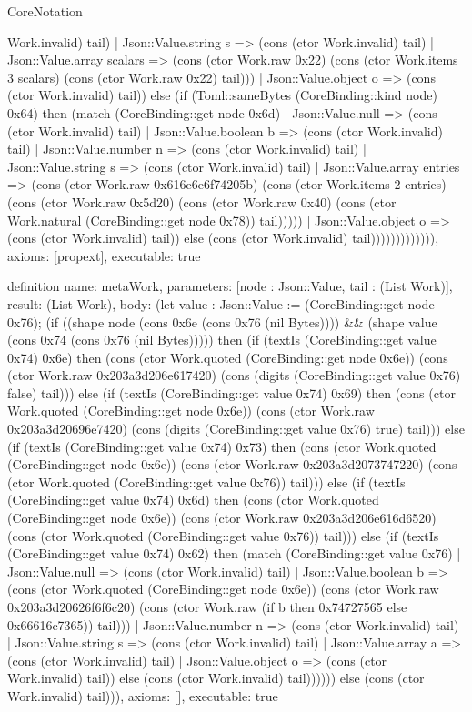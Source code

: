 \begin{lexlean}{CoreNotation}
\begin{semanticmodule}
{Work.invalid) tail) | Json::Value.string s => (cons (ctor Work.invalid) tail) | Json::Value.array scalars => (cons (ctor Work.raw 0x22) (cons (ctor Work.items 3 scalars) (cons (ctor Work.raw 0x22) tail))) | Json::Value.object o => (cons (ctor Work.invalid) tail)) else (if (Toml::sameBytes (CoreBinding::kind node) 0x64) then (match (CoreBinding::get node 0x6d) | Json::Value.null => (cons (ctor Work.invalid) tail) | Json::Value.boolean b => (cons (ctor Work.invalid) tail) | Json::Value.number n => (cons (ctor Work.invalid) tail) | Json::Value.string s => (cons (ctor Work.invalid) tail) | Json::Value.array entries => (cons (ctor Work.raw 0x616e6e6f74205b) (cons (ctor Work.items 2 entries) (cons (ctor Work.raw 0x5d20) (cons (ctor Work.raw 0x40) (cons (ctor Work.natural (CoreBinding::get node 0x78)) tail))))) | Json::Value.object o => (cons (ctor Work.invalid) tail)) else (cons (ctor Work.invalid) tail))))))))))))),
 axioms: [propext],
 executable: true
}

definition{
 name: metaWork,
 parameters: [node : Json::Value, tail : (List Work)],
 result: (List Work),
 body: (let value : Json::Value := (CoreBinding::get node 0x76); (if ((shape node (cons 0x6e (cons 0x76 (nil Bytes)))) && (shape value (cons 0x74 (cons 0x76 (nil Bytes))))) then (if (textIs (CoreBinding::get value 0x74) 0x6e) then (cons (ctor Work.quoted (CoreBinding::get node 0x6e)) (cons (ctor Work.raw 0x203a3d206e617420) (cons (digits (CoreBinding::get value 0x76) false) tail))) else (if (textIs (CoreBinding::get value 0x74) 0x69) then (cons (ctor Work.quoted (CoreBinding::get node 0x6e)) (cons (ctor Work.raw 0x203a3d20696e7420) (cons (digits (CoreBinding::get value 0x76) true) tail))) else (if (textIs (CoreBinding::get value 0x74) 0x73) then (cons (ctor Work.quoted (CoreBinding::get node 0x6e)) (cons (ctor Work.raw 0x203a3d2073747220) (cons (ctor Work.quoted (CoreBinding::get value 0x76)) tail))) else (if (textIs (CoreBinding::get value 0x74) 0x6d) then (cons (ctor Work.quoted (CoreBinding::get node 0x6e)) (cons (ctor Work.raw 0x203a3d206e616d6520) (cons (ctor Work.quoted (CoreBinding::get value 0x76)) tail))) else (if (textIs (CoreBinding::get value 0x74) 0x62) then (match (CoreBinding::get value 0x76) | Json::Value.null => (cons (ctor Work.invalid) tail) | Json::Value.boolean b => (cons (ctor Work.quoted (CoreBinding::get node 0x6e)) (cons (ctor Work.raw 0x203a3d20626f6f6c20) (cons (ctor Work.raw (if b then 0x74727565 else 0x66616c7365)) tail))) | Json::Value.number n => (cons (ctor Work.invalid) tail) | Json::Value.string s => (cons (ctor Work.invalid) tail) | Json::Value.array a => (cons (ctor Work.invalid) tail) | Json::Value.object o => (cons (ctor Work.invalid) tail)) else (cons (ctor Work.invalid) tail)))))) else (cons (ctor Work.invalid) tail))),
 axioms: [],
 executable: true
}


\end{semanticmodule}
\end{lexlean}
